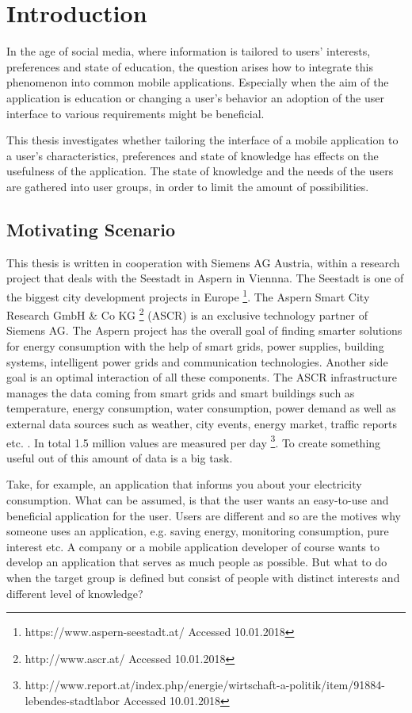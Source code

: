 \chapter{Introduction}

In the age of social media, where information is tailored to users' interests, preferences and state of education, the question arises how to integrate this phenomenon into common mobile applications. Especially when the aim of the application is education or changing a user's behavior an adoption of the user interface to various requirements might be beneficial.

This thesis investigates whether tailoring the interface of a mobile application to a user's characteristics, preferences and state of knowledge has effects on the usefulness of the application. The state of knowledge and the needs of the users are gathered into user groups, in order to limit the amount of possibilities.


\section{Motivating Scenario}

This thesis is written in cooperation with Siemens AG Austria, within a research project that deals with the Seestadt in Aspern in Viennna. The Seestadt is one of the biggest city development projects in Europe \footnote{https://www.aspern-seestadt.at/ Accessed 10.01.2018}. The Aspern Smart City Research GmbH \& Co KG \footnote{http://www.ascr.at/ Accessed 10.01.2018} (ASCR) is an exclusive technology partner of Siemens AG. The Aspern project has the overall goal of finding smarter solutions for energy consumption with the help of smart grids, power supplies, building systems, intelligent power grids and communication technologies. Another side goal is an optimal interaction of all these components. The ASCR infrastructure manages the data coming from smart grids and smart buildings such as temperature, energy consumption, water consumption, power demand as well as external data sources such as weather, city events, energy market, traffic reports etc. \cite{parreira2015role}. In total 1.5 million values are measured per day \footnote{http://www.report.at/index.php/energie/wirtschaft-a-politik/item/91884-lebendes-stadtlabor Accessed 10.01.2018}. To create something useful out of this amount of data is a big task. 

Take, for example, an application that informs you about your electricity consumption. What can be assumed, is that the user wants an easy-to-use and beneficial application for the user. Users are different and so are the motives why someone uses an application, e.g. saving energy, monitoring consumption, pure interest etc. A company or a mobile application developer of course wants to develop an application that serves as much people as possible. But what to do when the target group is defined but consist of people with distinct interests and different level of knowledge?

